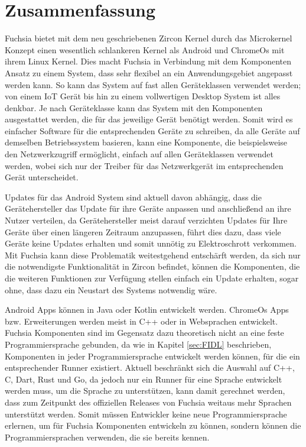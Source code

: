 \documentclass[a4paper]{scrartcl}
\begin{document}
\section{Zusammenfassung}
Fuchsia bietet mit dem neu geschriebenen Zircon Kernel durch das Microkernel Konzept einen wesentlich schlankeren Kernel als Android und ChromeOs mit ihrem Linux Kernel. Dies macht Fuchsia in Verbindung mit dem Komponenten Ansatz zu einem System, dass sehr flexibel an ein Anwendungsgebiet angepasst werden kann. So kann das System auf fast allen Geräteklassen verwendet werden; von einem IoT Gerät bis hin zu einem vollwertigen Desktop System ist alles denkbar. Je nach Geräteklasse kann das System mit den Komponenten ausgestattet werden, die für das jeweilige Gerät benötigt werden. Somit wird es einfacher Software für die entsprechenden Geräte zu schreiben, da alle Geräte auf demselben Betriebssystem basieren, kann eine Komponente, die beispielsweise den Netzwerkzugriff ermöglicht, einfach auf allen Geräteklassen verwendet werden, wobei sich nur der Treiber für das Netzwerkgerät im entsprechenden Gerät unterscheidet.

Updates für das Android System sind aktuell davon abhängig, dass die Gerätehersteller das Update für ihre Geräte anpassen und anschließend an ihre Nutzer verteilen, da Gerätehersteller meist darauf verzichten Updates für Ihre Geräte über einen längeren Zeitraum anzupassen, führt dies dazu, dass viele Geräte keine Updates erhalten und somit unnötig zu Elektroschrott verkommen. Mit Fuchsia kann diese Problematik weitestgehend entschärft werden, da sich nur die notwendigste Funktionalität in Zircon befindet, können die Komponenten, die die weiteren Funktionen zur Verfügung stellen einfach ein Update erhalten, sogar ohne, dass dazu ein Neustart des Systems notwendig wäre.

Android Apps können in Java oder Kotlin entwickelt werden. ChromeOs Apps bzw. Erweiterungen werden meist in C++ oder in Websprachen entwickelt. Fuchsia Komponenten sind im Gegensatz dazu theoretisch nicht an eine feste Programmiersprache gebunden, da wie in Kapitel \ref{sec:FIDL} beschrieben, Komponenten in jeder Programmiersprache entwickelt werden können, für die ein entsprechender Runner existiert. Aktuell beschränkt sich die Auswahl auf C++, C, Dart, Rust und Go, da jedoch nur ein Runner für eine Sprache entwickelt werden muss, um die Sprache zu unterstützen, kann damit gerechnet werden, dass zum Zeitpunkt des offiziellen Releases von Fuchsia weitaus mehr Sprachen unterstützt werden. Somit müssen Entwickler keine neue Programmiersprache erlernen, um für Fuchsia Komponenten entwickeln zu können, sondern können die Programmiersprachen verwenden, die sie bereits kennen.
\end{document}
